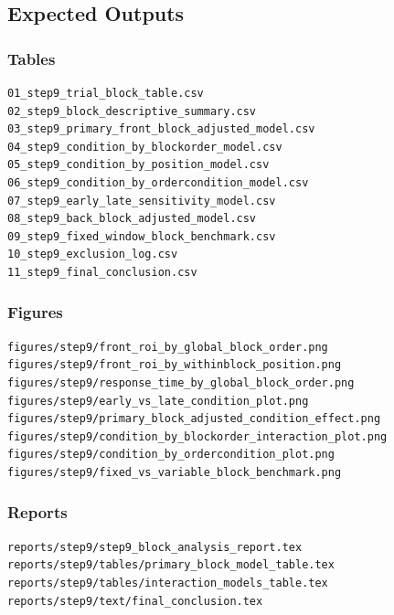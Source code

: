 \subsection{Expected Outputs}

\subsubsection*{Tables}
\begin{verbatim}
01_step9_trial_block_table.csv
02_step9_block_descriptive_summary.csv
03_step9_primary_front_block_adjusted_model.csv
04_step9_condition_by_blockorder_model.csv
05_step9_condition_by_position_model.csv
06_step9_condition_by_ordercondition_model.csv
07_step9_early_late_sensitivity_model.csv
08_step9_back_block_adjusted_model.csv
09_step9_fixed_window_block_benchmark.csv
10_step9_exclusion_log.csv
11_step9_final_conclusion.csv
\end{verbatim}

\subsubsection*{Figures}
\begin{verbatim}
figures/step9/front_roi_by_global_block_order.png
figures/step9/front_roi_by_withinblock_position.png
figures/step9/response_time_by_global_block_order.png
figures/step9/early_vs_late_condition_plot.png
figures/step9/primary_block_adjusted_condition_effect.png
figures/step9/condition_by_blockorder_interaction_plot.png
figures/step9/condition_by_ordercondition_plot.png
figures/step9/fixed_vs_variable_block_benchmark.png
\end{verbatim}

\subsubsection*{Reports}
\begin{verbatim}
reports/step9/step9_block_analysis_report.tex
reports/step9/tables/primary_block_model_table.tex
reports/step9/tables/interaction_models_table.tex
reports/step9/text/final_conclusion.tex
\end{verbatim}

